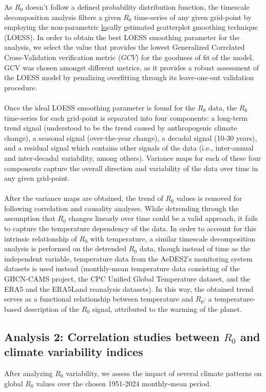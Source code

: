 \documentclass[10pt,twocolumn]{wlscirep}
\begin{document}
As $R_0$ doesn't follow a defined probability distribution function, the timescale decomposition analysis filters a given $R_0$ time-series of any given grid-point by employing the non-parametric \underline{lo}cally \underline{e}stimated \underline{s}catterplot \underline{s}moothing technique (LOESS)\cite{jacoby_2000}. In order to obtain the best LOESS smoothing parameter for the analysis, we select the value that provides the lowest Generalized Correlated Cross-Validation verification metric ($GCV$) for the goodness of fit of the model\cite{craven_1978}. GCV was chosen amongst different metrics, as it provides a robust assessment of the LOESS model by penalizing overfitting through its leave-one-out validation procedure\cite{marcotte_1995}.
\\
\\
Once the ideal LOESS smoothing parameter is found for the $R_0$ data, the $R_0$ time-series for each grid-point is separated into four components: a long-term trend signal (understood to be the trend caused by anthropogenic climate change), a seasonal signal (over-the-year change), a decadal signal (10-30 years), and a residual signal which contains other signals of the data (i.e., inter-annual and inter-decadal variability, among others). Variance maps for each of these four components capture the overall direction and variability of the data over time in any given grid-point.
\\
\\
After the variance maps are obtained, the trend of $R_0$ values is removed for following correlation and causality analyses. While detrending through the assumption that $R_0$ changes linearly over time could be a valid approach, it fails to capture the temperature dependency of the data. In order to account for this intrinsic relationship of $R_0$ with temperature, a similar timescale decomposition analysis is performed on the detrended $R_0$ data, though instead of time as the independent variable, temperature data from the AeDES2's monitoring system datasets is used instead (monthly-mean temperature data consisting of the GHCN-CAMS project\cite{fan_2008}, the CPC Unified Global Temperature dataset\cite{xie_2007}, and the ERA5 and the ERA5Land reanalysis datasets\cite{chen_2008}). In this way, the obtained trend serves as a functional relationship between temperature and $R_0$: a temperature-based description of the $R_0$ signal, attributed to the warming of the planet\cite{greene_2011}.

\subsection{Analysis 2: Correlation studies between $R_0$ and climate variability indices} \label{sec-methods-2}
After analyzing $R_0$ variability, we assess the impact of several climate patterns on global $R_0$ values over the chosen 1951-2024 monthly-mean period.
\end{document}
